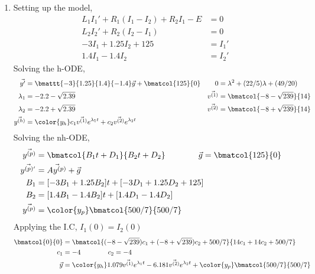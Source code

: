 \begin{enumerate}
    \item Setting up the model,
          \begin{align}
              L_1 I_1' + R_1 (I_1 - I_2) + R_2 I_1 - E & = 0    \\
              L_2 I_2' + R_2 (I_2 - I_1)               & = 0    \\
              -3I_1 + 1.25I_2 + 125                    & = I_1' \\
              1.4I_1 - 1.4I_2                          & = I_2'
          \end{align}
          Solving the h-ODE,
          \begin{align}
              \vec{y'}           & = \bmattt{-3}{1.25}{1.4}{-1.4} \vec{y}
              + \bmatcol{125}{0} &
              0                  & = \lambda^{2} + (22/5)\lambda + (49/20)   \\
              \lambda_1          & = -2.2 -  \sqrt{2.39}                   &
              \vec{v^{(1)}}      & = \bmatcol{-8 -\sqrt{239}}{14}            \\
              \lambda_2          & = -2.2 +  \sqrt{2.39}                   &
              \vec{v^{(2)}}      & = \bmatcol{-8 +\sqrt{239}}{14}            \\
              \vec{y^{(h)}}      & = \color{y_h}
              c_1 \vec{v^{(1)}}e^{\lambda_1 t}
              + c_2 \vec{v^{(2)}} e^{\lambda_2 t}
          \end{align}
          Solving the nh-ODE,
          \begin{align}
              \vec{y^{(p)}}             & = \bmatcol{B_1 t + D_1}
              {B_2 t + D_2} \qquad\qquad
              \vec{g} = \bmatcol{125}{0}                                       \\
              \vec{y^{(p)'}}            & = \vec{Ay^{(p)}} + \vec{g}           \\
              B_1                       & =  [-3B_1 + 1.25B_2] t
              + [-3D_1 + 1.25D_2 + 125] &                                      \\
              B_2                       & =  [1.4B_1 - 1.4B_2] t
              + [1.4D_1 - 1.4D_2]                                              \\
              \vec{y^{(p)}}             & = \color{y_p} \bmatcol{500/7}{500/7}
          \end{align}
          Applying the I.C, $ I_1(0) = I_2(0)$
          \begin{align}
              \bmatcol{0}{0} & = \bmatcol
              {(-8-\sqrt{239})c_1 + (-8+\sqrt{239})c_2 + 500/7}
              {14c_1 + 14c_2 + 500/7}                     \\
              c_1            & = -4 \qquad\qquad c_2 = -4 \\
              \vec{y}        & = {\color{y_h}
              1.079 \vec{v^{(1)}}e^{\lambda_1 t}
              - 6.181 \vec{v^{(2)}} e^{\lambda_2 t}}
              + {\color{y_p} \bmatcol{500/7}{500/7}}
          \end{align}
\end{enumerate}